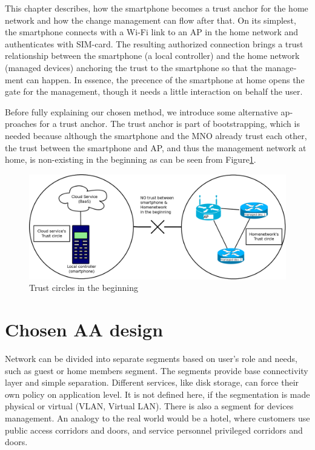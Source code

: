 \documentclass[12pt,a4paper,english]{tutthesis}
\begin{document}
\begin{otherlanguage}{english}
This chapter describes, how the smartphone becomes a trust anchor for
the home network and how the change management can flow after that.
On its simplest, the smartphone connects with a Wi-Fi link to an
AP in the home network and authenticates with SIM-card.
The resulting authorized connection brings a trust relationship
between the smartphone (a local controller)
and the home network (managed devices) anchoring the trust to the smartphone so that the 
management can happen. 
In essence, the precence of the smartphone at home
opens the gate for the management, though it needs a little
interaction on behalf the user.



Before fully explaining our chosen method, we introduce some 
alternative
approaches for a trust anchor. The trust anchor is part of bootstrapping,
which is needed because although the smartphone and the MNO
already trust each other, the trust between the smartphone and AP, and
thus the management network at home, is non-existing in the
beginning as can be seen from Figure\ref{fig:trustbegin}.

\begin{figure}[htb]
\centering
\includegraphics[width=.9\linewidth]{trustcircles.png}
\caption{\label{fig:trustbegin}Trust circles in the beginning}
\end{figure}


\section{Chosen AA design}
\label{sec-4-1}
\label{sec:chosendesign}



Network can be divided into separate segments based on user's role and
needs, such as guest or home members segment. The segments provide
base connectivity layer and simple separation. Different services,
like disk storage, can force their own policy on application level.
It is not defined here, if the segmentation is made physical or
virtual (VLAN, Virtual LAN).  There is also a segment for devices
management.  An analogy to the real world would be a hotel, where
customers use public access corridors and doors, and service personnel
privileged corridors and doors.



\end{otherlanguage}
\end{document}
